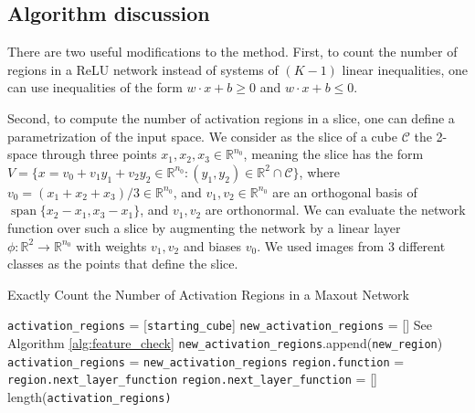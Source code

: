 \documentclass{article}
\theoremstyle{definition}
\newcommand{\nin}{n_0}
\begin{document}
\subsection{Algorithm discussion}

There are two useful modifications to the method.
First, to count the number of regions in a ReLU network instead of systems of $(K - 1)$ linear inequalities, one can use inequalities of the form $w \cdot x + b \geq 0$ and $w \cdot x + b \leq 0$.

Second, to compute the number of activation regions in a slice, one can define a parametrization of the input space.
We consider as the slice of a cube $\mathcal{C}$ the 2-space through three points $x_1,x_2,x_3\in\mathbb{R}^{\nin}$, meaning the slice has the form $V=\{x = v_0 + v_1 y_1 + v_2 y_2 \in \mathbb{R}^{\nin} \colon (y_1,y_2)\in \mathbb{R}^2\cap \mathcal{C} \}$, where $v_0 = (x_1+x_2+x_3)/3\in\mathbb{R}^{\nin}$, and $v_1,v_2\in\mathbb{R}^{\nin}$ are an orthogonal basis of $\operatorname{span}\{x_2-x_1, x_3-x_1\}$, 
and $v_1,v_2$ are orthonormal.
We can evaluate the network function over such a slice by augmenting the network by a linear layer $\phi\colon \mathbb{R}^2 \to \mathbb{R}^{\nin}$ with weights $v_1,v_2$ and biases $v_0$. 
We used images from 3 different classes as the points that define the slice. 

\begin{algorithm}[t]
    \caption{Exactly Count the Number of Activation Regions in a Maxout Network}
    \label{alg:exact_maxout}
    \begin{algorithmic}[1]
            \State \texttt{activation\_regions} = [\texttt{starting\_cube}]
                \State \texttt{new\_activation\_regions} = []
                            \LineComment See Algorithm \ref{alg:feature_check}
                                \State                                \texttt{new\_activation\_regions}.append(\texttt{new\_region})
                            \EndIf
                        \EndFor
                    \EndFor
                \State \texttt{activation\_regions} = \texttt{new\_activation\_regions}
                \EndFor
                    \State \texttt{region.function} = \texttt{region.next\_layer\_function}
                    \State \texttt{region.next\_layer\_function} = []
                \EndFor
            \EndFor
            \State \Return length(\texttt{activation\_regions)}
        \EndFunction
    \end{algorithmic}
    \label{algorith:exact_count}
\end{algorithm}
\end{document}
